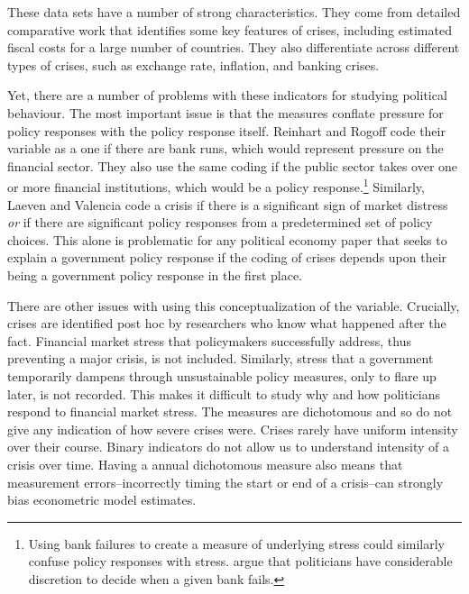 \documentclass[]{article}
\begin{document}
These data sets have a number of strong characteristics. They come from detailed comparative work that identifies some key features of crises, including estimated fiscal costs for a large number of countries. They also differentiate across different types of crises, such as exchange rate, inflation, and banking crises.

Yet, there are a number of problems with these indicators for studying political behaviour. The most important issue is that the measures conflate pressure for policy responses with the policy response itself. Reinhart and Rogoff code their variable as a one if there are bank runs, which would represent pressure on the financial sector. They also use the same coding if the public sector takes over one or more financial institutions, which would be a policy response.\footnote{Using bank failures to create a measure of underlying stress could similarly confuse policy responses with stress. \cite{deo2015} argue that politicians have considerable discretion to decide when a given bank fails.} Similarly, Laeven and Valencia code a crisis if there is a significant sign of market distress \emph{or} if there are significant policy responses from a predetermined set of policy choices. This alone is problematic for any political economy paper that seeks to explain a government policy response if the coding of crises depends upon their being a government policy response in the first place.

There are other issues with using this conceptualization of the variable. Crucially, crises are identified post hoc by researchers who know what happened after the fact. Financial market stress that policymakers successfully address, thus preventing a major crisis, is not included. Similarly, stress that a government temporarily dampens through unsustainable policy measures, only to flare up later, is not recorded. This makes it difficult to study why and how politicians respond to financial market stress. The measures are dichotomous and so do not give any indication of how severe crises were. Crises rarely have uniform intensity over their course. Binary indicators do not allow us to understand intensity of a crisis over time.  Having a annual dichotomous measure also means that measurement errors--incorrectly timing the start or end of a crisis--can strongly bias econometric model estimates.
\end{document}
